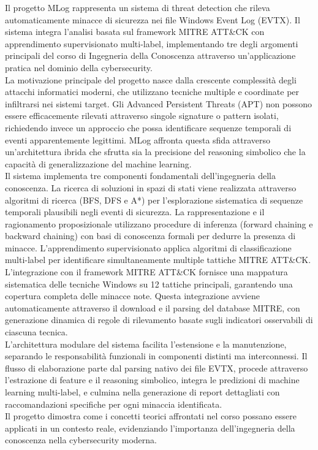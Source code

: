 \documentclass[12pt,a4paper]{report}
\theoremstyle{definition}
\begin{document}
Il progetto MLog rappresenta un sistema di threat detection che rileva automaticamente minacce di sicurezza nei file Windows Event Log (EVTX). Il sistema integra l'analisi basata sul framework MITRE ATT\&CK con apprendimento supervisionato multi-label, implementando tre degli argomenti principali del corso di Ingegneria della Conoscenza attraverso un'applicazione pratica nel dominio della cybersecurity.
\vspace{\baselineskip}\\
La motivazione principale del progetto nasce dalla crescente complessità degli attacchi informatici moderni, che utilizzano tecniche multiple e coordinate per infiltrarsi nei sistemi target. Gli Advanced Persistent Threats (APT) non possono essere efficacemente rilevati attraverso singole signature o pattern isolati, richiedendo invece un approccio che possa identificare sequenze temporali di eventi apparentemente legittimi. MLog affronta questa sfida attraverso un'architettura ibrida che sfrutta sia la precisione del reasoning simbolico che la capacità di generalizzazione del machine learning.
\vspace{\baselineskip}\\
Il sistema implementa tre componenti fondamentali dell'ingegneria della conoscenza. La ricerca di soluzioni in spazi di stati viene realizzata attraverso algoritmi di ricerca (BFS, DFS e A*) per l'esplorazione sistematica di sequenze temporali plausibili negli eventi di sicurezza. La rappresentazione e il ragionamento proposizionale utilizzano procedure di inferenza (forward chaining e backward chaining) con basi di conoscenza formali per dedurre la presenza di minacce. L'apprendimento supervisionato applica algoritmi di classificazione multi-label per identificare simultaneamente multiple tattiche MITRE ATT\&CK.
\vspace{\baselineskip}\\
L'integrazione con il framework MITRE ATT\&CK fornisce una mappatura sistematica delle tecniche Windows su 12 tattiche principali, garantendo una copertura completa delle minacce note. Questa integrazione avviene automaticamente attraverso il download e il parsing del database MITRE, con generazione dinamica di regole di rilevamento basate sugli indicatori osservabili di ciascuna tecnica.
\vspace{\baselineskip}\\
L'architettura modulare del sistema facilita l'estensione e la manutenzione, separando le responsabilità funzionali in componenti distinti ma interconnessi. Il flusso di elaborazione parte dal parsing nativo dei file EVTX, procede attraverso l'estrazione di feature e il reasoning simbolico, integra le predizioni di machine learning multi-label, e culmina nella generazione di report dettagliati con raccomandazioni specifiche per ogni minaccia identificata.
\vspace{\baselineskip}\\
Il progetto dimostra come i concetti teorici affrontati nel corso possano essere applicati in un contesto reale, evidenziando l'importanza dell'ingegneria della conoscenza nella cybersecurity moderna.
\end{document}

